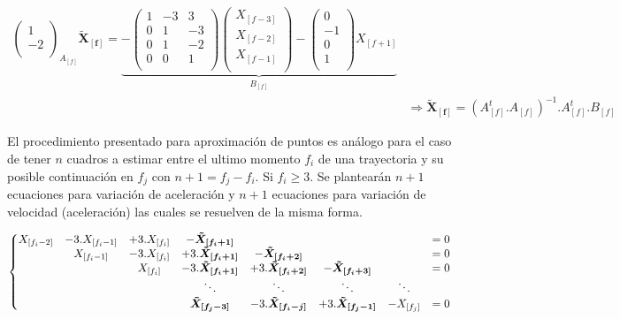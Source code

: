 {\begin{equation}
\begin{split}
{\begin{pmatrix}
1\\
-2\\
\end{pmatrix}
}_{A_{[f]}}\boldsymbol{\tilde{X}_{[f]}} = \underbrace{- \begin{pmatrix}
1 &-3 &3\\
0 &1 &-3\\
0 &1 &-2\\
0 &0 &1\\
\end{pmatrix}
\begin{pmatrix}
X_{[f-3]}\\
X_{[f-2]}\\
X_{[f-1]}\\
\end{pmatrix} - \begin{pmatrix}
0\\
-1\\
0\\
1\\
\end{pmatrix}
X_{[f+1]}}_{B_{[f]}} \\
&\Rightarrow \boldsymbol{\tilde{X}_{[f]}} = \left( A_{[f]}^{t}.A_{[f]}\right)^{-1}.A_{[f]}^{t}.B_{[f]}
\end{split}
\label{matrices_estimacion_01}
\end{equation}}

El procedimiento presentado para aproximación de puntos es análogo para el caso de tener $n$ cuadros a estimar entre el ultimo momento $f_{i}$ de una trayectoria y su posible continuación en $f_{j}$ con $n+1=f_{j}-f_{i}$. Si $f_{i} \geq 3$. Se plantearán $n+1$ ecuaciones para variación de aceleración y $n+1$ ecuaciones para variación de velocidad (aceleración) las cuales se resuelven de la misma forma. 

{\scriptsize \begin{equation}
\hspace{-0cm}
\left\{
\begin{matrix}
X_{[f_{i}-2]} &-3.X_{[f_{i}-1]} &+3.X_{[f_{i}]} &-\boldsymbol{\tilde{X}_{[f_{i}+1]}} & & & &=0 \\
& X_{[f_{i}-1]} &-3.X_{[f_{i}]} &+3.\boldsymbol{\tilde{X}_{[f_{i}+1]}} &-\boldsymbol{\tilde{X}_{[f_{i}+2]}} & & &=0 \\
& & X_{[f_{i}]} &-3.\boldsymbol{\tilde{X}_{[f_{i}+1]}} &+3.\boldsymbol{\tilde{X}_{[f_{i}+2]}} &-\boldsymbol{\tilde{X}_{[f_{i}+3]}}& &=0 \\
& & & \ddots & \ddots & \ddots & \ddots & \\
& & & \boldsymbol{\tilde{X}_{[f_{j}-3]}} &-3.\boldsymbol{\tilde{X}_{[f_{i}-j]}} &+3.\boldsymbol{\tilde{X}_{[f_{j}-1]}} &-X_{[f_{j}]} &=0 \\
\end{matrix}
\right.
\label{ecuaciones_estimacion_n}
\end{equation}}

